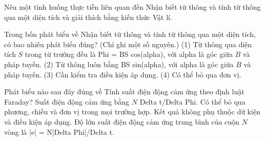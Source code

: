 \begin{bt}
Nêu một tình huống thực tiễn liên quan đến Nhận biết từ thông và tính từ thông qua một diện tích và giải thích bằng kiến thức Vật lí.
\end{bt}

\begin{ex}
Trong bốn phát biểu về Nhận biết từ thông và tính từ thông qua một diện tích, có bao nhiêu phát biểu đúng? (Chỉ ghi một số nguyên.) (1) Từ thông qua diện tích $S$ trong từ trường đều là Phi = BS cos(alpha), với alpha là góc giữa $B$ và pháp tuyến. (2) Từ thông luôn bằng BS sin(alpha), với alpha là góc giữa $B$ và pháp tuyến. (3) Cần kiểm tra điều kiện áp dụng. (4) Có thể bỏ qua đơn vị.
\end{ex}

\begin{ex}
Phát biểu nào sau đây đúng về Tính suất điện động cảm ứng theo định luật Faraday?
\choice
{Suất điện động cảm ứng bằng $N$ Delta t/Delta Phi.}
{Có thể bỏ qua phương, chiều và đơn vị trong mọi trường hợp.}
{Kết quả không phụ thuộc dữ kiện và điều kiện áp dụng.}
{\True Độ lớn suất điện động cảm ứng trung bình của cuộn $N$ vòng là |e| = N|Delta Phi|/Delta t.}
\end{ex}

